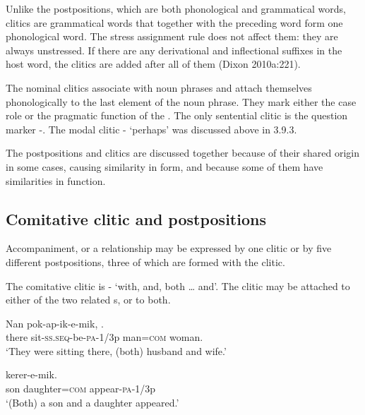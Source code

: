 Unlike the postpositions, which are both phonological and grammatical words, clitics are grammatical words that together with the preceding word form one phonological word. The stress assignment rule does not affect them: they are always unstressed. If there are any derivational and inflectional suffixes in the host word, the clitics are added after all of them (Dixon 2010a:221).

The nominal clitics associate with noun phrases and attach themselves phonologically to the last element of the noun phrase. They mark either the case role or the pragmatic function of the . The only sentential clitic is the question marker \nobreakdash-. The modal clitic - `perhaps' was discussed above in 3.9.3.

The postpositions and clitics are discussed together because of their shared origin in some cases, causing similarity in form, and because some of them have similarities in function.

\subsection{Comitative clitic and postpositions}\label{sec:3:y:x}
{}
Accompaniment, or a relationship may be expressed by one clitic or by five different postpositions, three of which are formed with the clitic. 

The comitative clitic is - `with, and, both {\dots} and'. The clitic may be attached to either of the two related s, or to both.

\ea%
\label{ex:3:x775}
\gll Nan pok-ap-ik-e-mik,  . \\
there sit-\textsc{ss}.\textsc{seq}-be-\textsc{pa}-1/3p man=\textsc{com} woman.\\
\glt`They were sitting there, (both) husband and wife.'
\z

\ea%
\label{ex:3:x776}
\gll {}  kerer-e-mik. \\
son daughter=\textsc{com} appear-\textsc{pa}-1/3p\\
\glt`(Both) a son and a daughter appeared.'
\z

